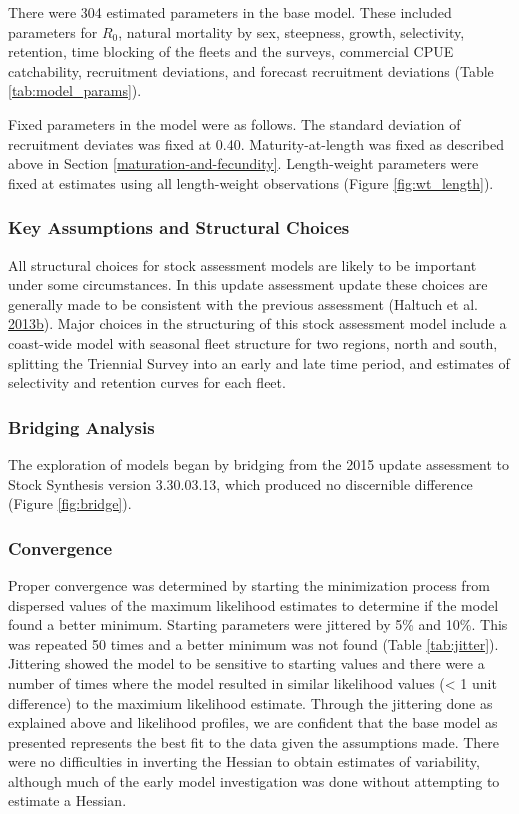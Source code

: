 \documentclass[12pt,]{article}
\begin{document}
There were 304 estimated parameters in the base model. These included
parameters for \(R_0\), natural mortality by sex, steepness, growth,
selectivity, retention, time blocking of the fleets and the surveys,
commercial CPUE catchability, recruitment deviations, and forecast
recruitment deviations (Table \ref{tab:model_params}).

Fixed parameters in the model were as follows. The standard deviation of
recruitment deviates was fixed at 0.40. Maturity-at-length was fixed as
described above in Section \ref{maturation-and-fecundity}. Length-weight
parameters were fixed at estimates using all length-weight observations
(Figure \ref{fig:wt_length}).

\subsubsection{Key Assumptions and Structural
Choices}\label{key-assumptions-and-structural-choices}

All structural choices for stock assessment models are likely to be
important under some circumstances. In this update assessment update
these choices are generally made to be consistent with the previous
assessment (Haltuch et al.
\protect\hyperlink{ref-haltuch_status_2013}{2013}\protect\hyperlink{ref-haltuch_status_2013}{b}).
Major choices in the structuring of this stock assessment model include
a coast-wide model with seasonal fleet structure for two regions, north
and south, splitting the Triennial Survey into an early and late time
period, and estimates of selectivity and retention curves for each
fleet.

\subsubsection{Bridging Analysis}\label{bridging-analysis}

The exploration of models began by bridging from the 2015 update
assessment to Stock Synthesis version 3.30.03.13, which produced no
discernible difference (Figure \ref{fig:bridge}).

\subsubsection{Convergence}\label{convergence}

Proper convergence was determined by starting the minimization process
from dispersed values of the maximum likelihood estimates to determine
if the model found a better minimum. Starting parameters were jittered
by 5\% and 10\%. This was repeated 50 times and a better minimum was not
found (Table \ref{tab:jitter}). Jittering showed the model to be
sensitive to starting values and there were a number of times where the
model resulted in similar likelihood values (\textless{} 1 unit
difference) to the maximium likelihood estimate. Through the jittering
done as explained above and likelihood profiles, we are confident that
the base model as presented represents the best fit to the data given
the assumptions made. There were no difficulties in inverting the
Hessian to obtain estimates of variability, although much of the early
model investigation was done without attempting to estimate a Hessian.
\end{document}
